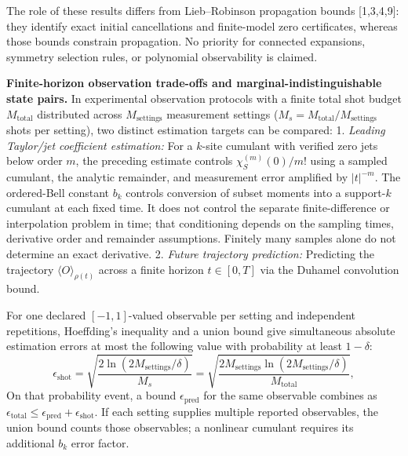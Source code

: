 \documentclass[
  11pt,
]{article}
\begin{document}
The role of these results differs from Lieb--Robinson propagation bounds
{[}1,3,4,9{]}: they identify exact initial cancellations and finite-model zero
certificates, whereas those bounds constrain propagation. No priority for
connected expansions, symmetry selection rules, or polynomial observability
is claimed.

\textbf{Finite-horizon observation trade-offs and marginal-indistinguishable state pairs.}
In experimental observation protocols with a finite total shot budget \(M_{\mathrm{total}}\) distributed across \(M_{\mathrm{settings}}\) measurement settings (\(M_s = M_{\mathrm{total}} / M_{\mathrm{settings}}\) shots per setting), two distinct estimation targets can be compared:
1. \emph{Leading Taylor/jet coefficient estimation:} For a \(k\)-site cumulant with verified zero jets below order \(m\), the preceding estimate controls \(\chi_S^{(m)}(0)/m!\) using a sampled cumulant, the analytic remainder, and measurement error amplified by \(|t|^{-m}\). The ordered-Bell constant \(b_k\) controls conversion of subset moments into a support-\(k\) cumulant at each fixed time. It does not control the separate finite-difference or interpolation problem in time; that conditioning depends on the sampling times, derivative order and remainder assumptions. Finitely many samples alone do not determine an exact derivative.
2. \emph{Future trajectory prediction:} Predicting the trajectory \(\langle O\rangle_{\rho(t)}\) across a finite horizon \(t \in [0, T]\) via the Duhamel convolution bound.

For one declared \([-1,1]\)-valued observable per setting and independent repetitions, Hoeffding's inequality and a union bound give simultaneous absolute estimation errors at most the following value with probability at least \(1-\delta\):
\[
\epsilon_{\mathrm{shot}} = \sqrt{\frac{2\ln(2M_{\mathrm{settings}}/\delta)}{M_s}} = \sqrt{\frac{2M_{\mathrm{settings}}\ln(2M_{\mathrm{settings}}/\delta)}{M_{\mathrm{total}}}},
\]
On that probability event, a bound \(\epsilon_{\mathrm{pred}}\) for the same observable combines as \(\epsilon_{\mathrm{total}}\le\epsilon_{\mathrm{pred}}+\epsilon_{\mathrm{shot}}\). If each setting supplies multiple reported observables, the union bound counts those observables; a nonlinear cumulant requires its additional \(b_k\) error factor.
\end{document}
